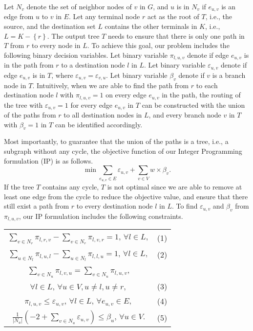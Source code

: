 \documentclass[conference]{IEEEtran}
\begin{document}
Let $N_{v}$ denote the set of neighbor nodes of $v$ in $G$, and $u$ is in $N_{v}$ if $e_{u,v}$ is an edge from $u$ to $v$ in $E$. Let any terminal node $r$ act as the
root of $T$, i.e., the source, and the destination set $L$ contains the other terminals in $K$, i.e., $L=K-\left \{ r\right \} $. The output tree $T$ needs to ensure that there is
only one path in $T$ from $r$ to every node in $L$. To achieve this goal,
our problem includes the following binary decision variables. Let binary
variable $\pi _{l,u,v}$ denote if edge $e_{u,v}$ is in the path from $r $ to a destination node $l$ in $L$. Let binary variable $\varepsilon _{u,v}$
denote if edge $e_{u,v}$ is in $T$, where $\varepsilon _{u,v}=\varepsilon
_{v,u}$. Let binary variable $\beta _{v}$ denote if $v$ is a branch node in $T$. Intuitively, when we are able to find the path from $r$ to each destination
node $l$ with $\pi _{l,u,v}=1$ on every edge $e_{u,v}$ in the path, the
routing of the tree with $\varepsilon _{u,v}=1$ for every edge $e_{u,v}$ in $T$ can be constructed with the union of the paths from $r$ to all destination
nodes in $L$, and every branch node $v$ in $T$ with $\beta _{v}=1$ in $T$
can be identified accordingly.

Most importantly, to guarantee that the union of the paths is a tree, i.e.,
a subgraph without any cycle, the objective function of our Integer
Programming formulation (IP) is as follows.\[
\min \sum \limits_{e_{u,v}\in E}\varepsilon _{u,v}+\sum \limits_{v\in
V}w\times \beta _{v}.
\]If the tree $T$ contains any cycle, $T$ is not optimal since we are able to
remove at least one edge from the cycle to reduce the objective value, and
ensure that there still exist a path from $r$ to every destination node $l$ in $L$.
To find $\varepsilon _{u,v}$ and $\beta _{v}$ from $\pi _{l,u,v}$, our IP
formulation includes the following constraints.

\begin{center}
\begin{tabular}{cc}
$\sum \limits_{v\in N_{r}}\pi _{l,r,v}-\sum \limits_{v\in N_{r}}\pi
_{l,v,r}=1$, $\forall l\in L,$ & (1)\\
\vspace{2pt}
$\sum \limits_{u\in N_{l}}\pi _{l,u,l}-\sum \limits_{u\in N_{l}}\pi
_{l,l,u}=1$, $\forall l\in L,$ & (2)\\
\vspace{2pt}
$\sum \limits_{v\in N_{u}}\pi _{l,v,u}=\sum \limits_{v\in N_{u}}\pi _{l,u,v}$, \\ $\forall l\in L$, $\forall u\in V,u\neq l,u\neq r,$ & (3)\\
\vspace{2pt}
$\pi _{l,u,v}\leq \varepsilon _{u,v}$, $\forall l\in L$, $\forall e_{u,v}\in
E,$ & (4)\\
\vspace{2pt}
$\frac{1}{\left \vert N_{u}\right \vert }\left( -2+\sum \limits_{v\in
N_{u}}\varepsilon _{u,v}\right) \leq \beta _{u}$, $\forall u\in V.$ & (5)\end{tabular}
\end{center}
\end{document}
